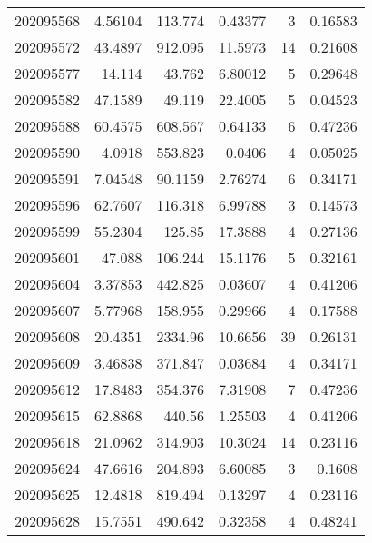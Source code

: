 \begin{tabular}{rrrrrr}
 202095568 &          4.56104 &      113.774  &            0.43377 &           3 & 0.16583 \\
 202095572 &         43.4897  &      912.095  &           11.5973  &          14 & 0.21608 \\
 202095577 &         14.114   &       43.762  &            6.80012 &           5 & 0.29648 \\
 202095582 &         47.1589  &       49.119  &           22.4005  &           5 & 0.04523 \\
 202095588 &         60.4575  &      608.567  &            0.64133 &           6 & 0.47236 \\
 202095590 &          4.0918  &      553.823  &            0.0406  &           4 & 0.05025 \\
 202095591 &          7.04548 &       90.1159 &            2.76274 &           6 & 0.34171 \\
 202095596 &         62.7607  &      116.318  &            6.99788 &           3 & 0.14573 \\
 202095599 &         55.2304  &      125.85   &           17.3888  &           4 & 0.27136 \\
 202095601 &         47.088   &      106.244  &           15.1176  &           5 & 0.32161 \\
 202095604 &          3.37853 &      442.825  &            0.03607 &           4 & 0.41206 \\
 202095607 &          5.77968 &      158.955  &            0.29966 &           4 & 0.17588 \\
 202095608 &         20.4351  &     2334.96   &           10.6656  &          39 & 0.26131 \\
 202095609 &          3.46838 &      371.847  &            0.03684 &           4 & 0.34171 \\
 202095612 &         17.8483  &      354.376  &            7.31908 &           7 & 0.47236 \\
 202095615 &         62.8868  &      440.56   &            1.25503 &           4 & 0.41206 \\
 202095618 &         21.0962  &      314.903  &           10.3024  &          14 & 0.23116 \\
 202095624 &         47.6616  &      204.893  &            6.60085 &           3 & 0.1608  \\
 202095625 &         12.4818  &      819.494  &            0.13297 &           4 & 0.23116 \\
 202095628 &         15.7551  &      490.642  &            0.32358 &           4 & 0.48241 \\

\end{tabular}
